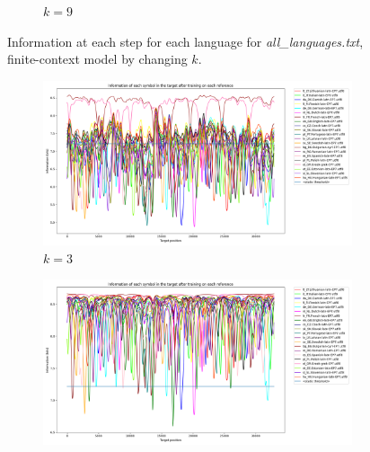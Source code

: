 \documentclass{article}
\begin{document}
\begin{figure}
\begin{subfigure}[b]{0.3\textwidth}
\begin{center}
        \end{center}
        \caption{$k = 9$}
        \label{fig:all_languages_p_c:1:9}
    \end{subfigure}
    
    \caption{Information at each step for each language for \textit{all\_languages.txt}, finite-context model by changing $k$.}
    \label{fig:all_languages_p_c}
\end{figure}

\begin{figure}
    \begin{subfigure}[b]{0.3\textwidth}
        \begin{center}
            \includegraphics[width=1.0\linewidth]{../results/all_languages_random/-p_c:1:3.png}
        \end{center}
        \caption{$k = 3$}
        \label{fig:all_languages_random_p_c:1:3}
    \end{subfigure}
    \hfill
    \begin{subfigure}[b]{0.3\textwidth}
        \begin{center}
            \includegraphics[width=1.0\linewidth]{../results/all_languages_random/-p_c:1:6.png}

\end{center}
\end{subfigure}
\end{figure}
\end{document}
